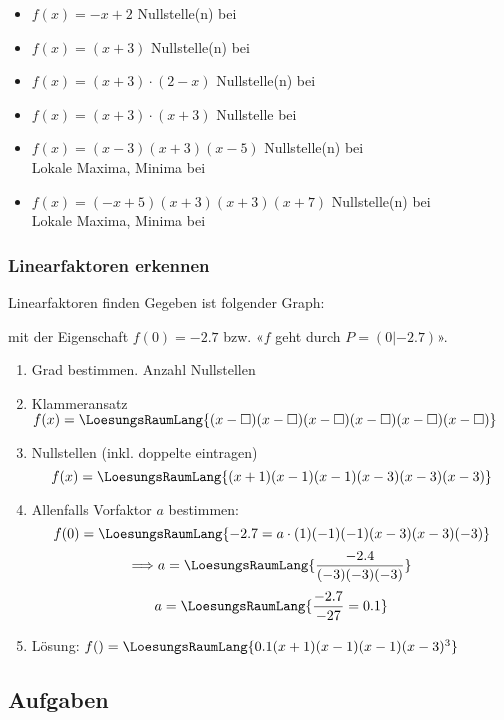 \begin{itemize}
\item $f(x) = -x + 2 $ Nullstelle(n) bei  
\item $f(x) = (x+3)$ Nullstelle(n) bei 
\item $f(x) = (x+3)\cdot{}(2-x)$ Nullstelle(n) bei
\item $f(x) = (x+3)\cdot{}(x+3)$ 
  Nullstelle bei 
\item $f(x) = (x-3)(x+3)(x-5)$ Nullstelle(n) bei \\
  Lokale Maxima, Minima bei 
\item $f(x) = (-x+5)(x+3)(x+3)(x+7)$ Nullstelle(n) bei
  \\
  Lokale Maxima, Minima bei 
\end{itemize}
\newpage


\subsubsection{Linearfaktoren erkennen}

\begin{rezept}{Linearfaktoren finden}{}
Gegeben ist folgender Graph:

  mit der Eigenschaft $f(0) = -2.7$ bzw. «$f$ geht durch $P=(0|-2.7)$».
    
    \begin{enumerate}
  \item Grad bestimmen. Anzahl Nullstellen  
  \item Klammeransatz $f(x) =
    \LoesungsRaumLang{(x-\Box)(x-\Box)(x-\Box)(x-\Box)(x-\Box)(x-\Box)}$
  \item Nullstellen (inkl. doppelte eintragen)
    $$f(x) = \LoesungsRaumLang{(x+1)(x-1)(x-1)(x-3)(x-3)(x-3)}$$
  \item Allenfalls Vorfaktor $a$ bestimmen:
    $$f(0) = \LoesungsRaumLang{-2.7 = a \cdot{}(1)(-1)(-1)(x-3)(x-3)(-3)}$$
    $$\Longrightarrow a= \LoesungsRaumLang{\frac{-2.4}{(-3)(-3)(-3)}}$$
    $$a  = \LoesungsRaumLang{\frac{-2.7}{-27} = 0.1}$$

  \item Lösung: $f() = \LoesungsRaumLang{0.1 (x+1)(x-1)(x-1)(x-3)^3}$ 
    \end{enumerate}
  
  \end{rezept}
\newpage


\subsection*{Aufgaben}

\TNTeop{}%


\newpage

